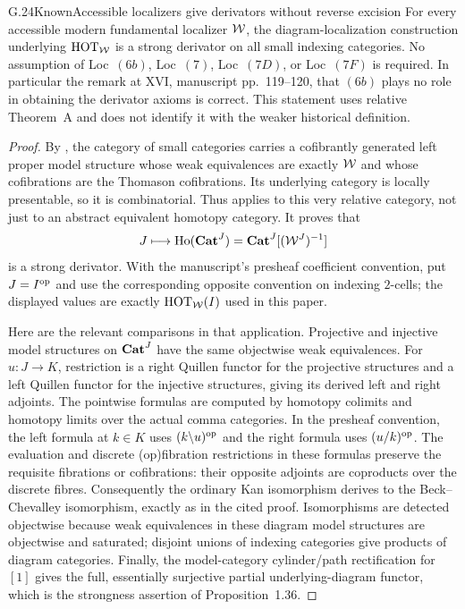 \begin{claim}{G.24}{Known}{Accessible localizers give derivators without reverse excision}
For every accessible modern fundamental localizer $\mathcal{W}$, the diagram-localization construction underlying $\mathrm{HOT}_{\mathcal{W}}$ is a strong derivator on all small indexing categories. No assumption of Loc~$(6b)$, Loc~$(7)$, Loc~$(7D)$, or Loc~$(7F)$ is required. In particular the remark at XVI, manuscript pp.~119--120, that $(6b)$ plays no role in obtaining the derivator axioms is correct. This statement uses relative Theorem~A and does not identify it with the weaker historical definition.
\end{claim}
\begin{proof}
By \citet[Theorem~5.2.15, p.~225]{RootCisinski2006}, the category of small categories carries a cofibrantly generated left proper model structure whose weak equivalences are exactly $\mathcal{W}$ and whose cofibrations are the Thomason cofibrations. Its underlying category is locally presentable, so it is combinatorial. Thus \citet[Proposition~1.36, with Theorem~1.34 and Lemmas~1.35--1.37]{AGGroth2013} applies to this very relative category, not just to an abstract equivalent homotopy category. It proves that
\[
J\longmapsto\operatorname{Ho}(\mathbf{Cat}^J)=\mathbf{Cat}^J[(\mathcal{W}^J)^{-1}]
\]
is a strong derivator. With the manuscript's presheaf coefficient convention, put $J=I^{\mathrm{op}}$ and use the corresponding opposite convention on indexing $2$-cells; the displayed values are exactly $\mathrm{HOT}_{\mathcal{W}}(I)$ used in this paper.

Here are the relevant comparisons in that application. Projective and injective model structures on $\mathbf{Cat}^J$ have the same objectwise weak equivalences. For $u:J\to K$, restriction is a right Quillen functor for the projective structures and a left Quillen functor for the injective structures, giving its derived left and right adjoints. The pointwise formulas are computed by homotopy colimits and homotopy limits over the actual comma categories. In the presheaf convention, the left formula at $k\in K$ uses $(k\backslash u)^{\mathrm{op}}$ and the right formula uses $(u/k)^{\mathrm{op}}$. The evaluation and discrete (op)fibration restrictions in these formulas preserve the requisite fibrations or cofibrations: their opposite adjoints are coproducts over the discrete fibres. Consequently the ordinary Kan isomorphism derives to the Beck--Chevalley isomorphism, exactly as in the cited proof. Isomorphisms are detected objectwise because weak equivalences in these diagram model structures are objectwise and saturated; disjoint unions of indexing categories give products of diagram categories. Finally, the model-category cylinder/path rectification for $[1]$ gives the full, essentially surjective partial underlying-diagram functor, which is the strongness assertion of Proposition~1.36.


\end{proof}
